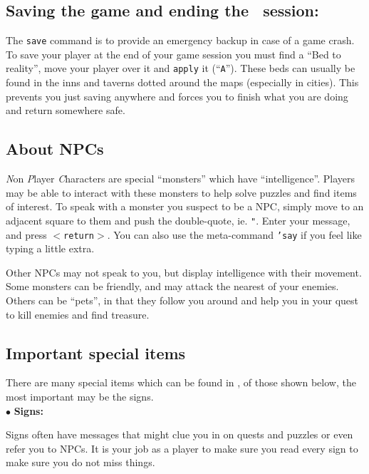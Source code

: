 \subsection{Saving the game and ending the \cf\ session:}
 
The {\tt save} command is to provide an emergency backup in case of a game crash.
To save your player at the end of your game session you must find a ``Bed to 
reality'', move your player over it and 
{\tt apply} it (``{\tt A}''). These beds can usually be
found in the inns and
taverns dotted around the maps (especially in cities). This prevents you
just saving anywhere and forces you to finish what you are doing and return
somewhere safe.

\subsection{About NPCs}
{\em N}on {\em P}layer {\em C}haracters are special
``monsters'' which have ``intelligence''. Players
may be able to interact with these monsters to help solve puzzles and find
items of interest. To speak with a monster you suspect to be a NPC, simply
move to an adjacent square to them and push the double-quote, ie. {\tt "}. Enter
your message, and press {\tt $<$return$>$}. You can also use the meta-command 
{\tt 'say} if you feel like typing a little extra.

Other NPCs may not speak to you, but display intelligence with their
movement. Some monsters can be friendly, and may attack the nearest of your
enemies. Others can be ``pets'', in that they follow you around and help you
in your quest to kill enemies and find treasure.


\subsection{Important special items}

There are many special items which can be found in \cf , of those shown
below, the most important may be the signs. \\ 

$\bullet$ {\bf Signs:} 

Signs often have messages that might clue you in on quests and puzzles
or even refer you to NPCs. It is your job as a player to make sure you
read every sign to make sure you do not miss things. \\ 

